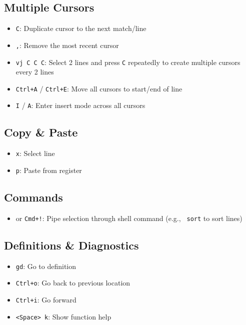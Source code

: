 \documentclass[
  letterpaper,
  DIV=11,
  numbers=noendperiod]{scrartcl}
\providecommand{\tightlist}{%
  \setlength{\itemsep}{0pt}\setlength{\parskip}{0pt}}\usepackage{longtable,booktabs,array}
\begin{document}
\subsection{\texorpdfstring{\textbf{Multiple
Cursors}}{Multiple Cursors}}\label{multiple-cursors}

\begin{itemize}
\tightlist
\item
  \texttt{C}: Duplicate cursor to the next match/line
\item
  \texttt{,}: Remove the most recent cursor
\item
  \texttt{vj\ C\ C\ C}: Select 2 lines and press \texttt{C} repeatedly
  to create multiple cursors every 2 lines
\item
  \texttt{Ctrl+A} / \texttt{Ctrl+E}: Move all cursors to start/end of
  line
\item
  \texttt{I} / \texttt{A}: Enter insert mode across all cursors
\end{itemize}

\subsection{\texorpdfstring{\textbf{Copy \&
Paste}}{Copy \& Paste}}\label{copy-paste}

\begin{itemize}
\tightlist
\item
  \texttt{x}: Select line
\item
  \texttt{p}: Paste from register
\end{itemize}

\subsection{\texorpdfstring{\textbf{Commands}}{Commands}}\label{commands}

\begin{itemize}
\tightlist
\item
  \texttt{\textbar{}} or \texttt{Cmd+!}: Pipe selection through shell
  command (e.g., \texttt{\textbar{}\ sort} to sort lines)
\end{itemize}

\subsection{\texorpdfstring{\textbf{Definitions \&
Diagnostics}}{Definitions \& Diagnostics}}\label{definitions-diagnostics}

\begin{itemize}
\tightlist
\item
  \texttt{gd}: Go to definition
\item
  \texttt{Ctrl+o}: Go back to previous location
\item
  \texttt{Ctrl+i}: Go forward
\item
  \texttt{\textless{}Space\textgreater{}\ k}: Show function help
\end{itemize}
\end{document}
